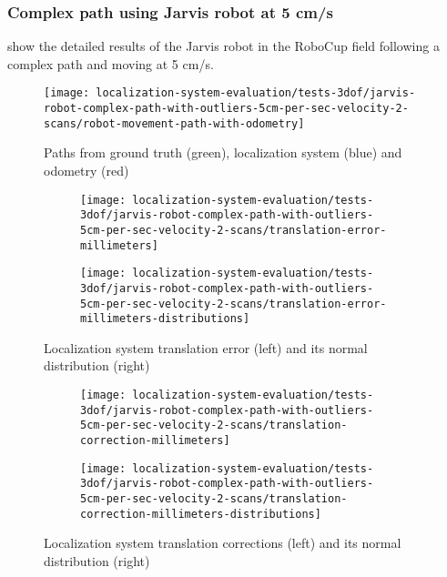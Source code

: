 \subsubsection{Complex path using Jarvis robot at 5 cm/s}

 show the detailed results of the Jarvis robot in the RoboCup field following a complex path and moving at 5 cm/s.

\begin{figure}[H]
	\centering
	\texttt{[image: localization-system-evaluation/tests-3dof/jarvis-robot-complex-path-with-outliers-5cm-per-sec-velocity-2-scans/robot-movement-path-with-odometry]}
	\caption{Paths from ground truth (green), localization system (blue) and odometry (red)}
	\label{fig:localization-system-evaluation_jarvis-robot-complex-path-with-outliers-5cm-per-sec-velocity-2-scans}
\end{figure}

\begin{figure}[H]
	\centering
	\begin{subfigure}[h]{.497\textwidth}
		\centering
		\texttt{[image: localization-system-evaluation/tests-3dof/jarvis-robot-complex-path-with-outliers-5cm-per-sec-velocity-2-scans/translation-error-millimeters]}
	\end{subfigure}
	\begin{subfigure}[h]{.497\textwidth}
		\centering
		\texttt{[image: localization-system-evaluation/tests-3dof/jarvis-robot-complex-path-with-outliers-5cm-per-sec-velocity-2-scans/translation-error-millimeters-distributions]}
	\end{subfigure}
	\caption{Localization system translation error (left) and its normal distribution (right)}
	\label{fig:localization-system-evaluation_jarvis-robot-complex-path-with-outliers-5cm-per-sec-velocity-2-scans_translation-errors}
\end{figure}

\begin{figure}[H]
	\centering
	\begin{subfigure}[h]{.497\textwidth}
		\centering
		\texttt{[image: localization-system-evaluation/tests-3dof/jarvis-robot-complex-path-with-outliers-5cm-per-sec-velocity-2-scans/translation-correction-millimeters]}
	\end{subfigure}
	\begin{subfigure}[h]{.497\textwidth}
		\centering
		\texttt{[image: localization-system-evaluation/tests-3dof/jarvis-robot-complex-path-with-outliers-5cm-per-sec-velocity-2-scans/translation-correction-millimeters-distributions]}
	\end{subfigure}
	\caption{Localization system translation corrections (left) and its normal distribution (right)}
	\label{fig:localization-system-evaluation_jarvis-robot-complex-path-with-outliers-5cm-per-sec-velocity-2-scans_translation-errors-corrections}
\end{figure}


